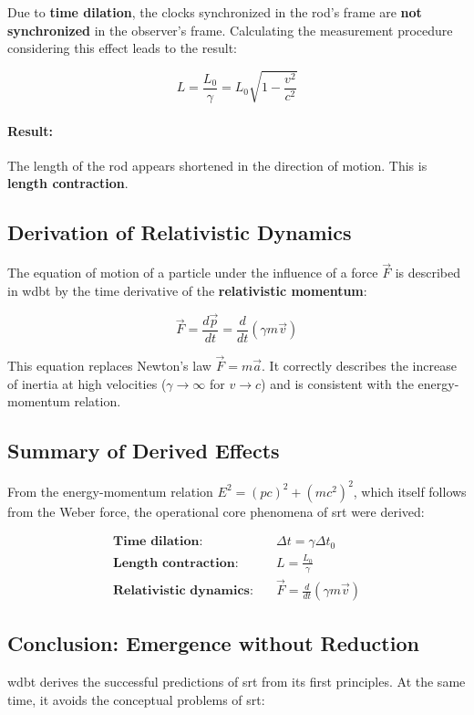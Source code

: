 Due to \textbf{time dilation}, the clocks synchronized in the rod's frame are \textbf{not synchronized} in the observer's frame. Calculating the measurement procedure considering this effect leads to the result:

\begin{equation}
    \label{eq:längenkontraktion}
    L = \frac{L_0}{\gamma} = L_0 \sqrt{1 - \frac{v^2}{c^2}}
\end{equation}

\paragraph{Result:} The length of the rod appears shortened in the direction of motion. This is \textbf{length contraction}.

\subsection{Derivation of Relativistic Dynamics}
The equation of motion of a particle under the influence of a force $\vec{F}$ is described in \gls{wdbt} by the time derivative of the \textbf{relativistic momentum}:

\begin{equation}
    \label{eq:relativistischer_impuls}
    \vec{F} = \frac{d\vec{p}}{dt} = \frac{d}{dt} (\gamma m \vec{v})
\end{equation}

This equation replaces Newton's law $\vec{F} = m\vec{a}$. It correctly describes the increase of inertia at high velocities ($\gamma \to \infty$ for $v \to c$) and is consistent with the energy-momentum relation.

\subsection{Summary of Derived Effects}
From the energy-momentum relation $E^2 = (pc)^2 + (mc^2)^2$, which itself follows from the Weber force, the operational core phenomena of \gls{srt} were derived:

\begin{align*}
\textbf{Time dilation:} \quad & \Delta t = \gamma \Delta t_0 \\
\textbf{Length contraction:} \quad & L = \frac{L_0}{\gamma} \\
\textbf{Relativistic dynamics:} \quad & \vec{F} = \frac{d}{dt}(\gamma m \vec{v})
\end{align*}

\subsection{Conclusion: Emergence without Reduction}
\gls{wdbt} derives the successful predictions of \gls{srt} from its first principles. At the same time, it avoids the conceptual problems of \gls{srt}:

